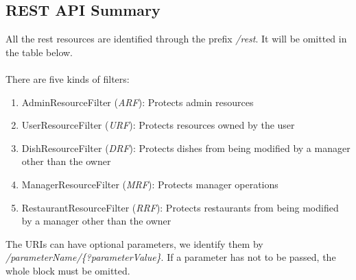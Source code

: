 \subsection{REST API Summary}

All the rest resources are identified through the prefix \textit{/rest}. It will be omitted in the table below.\\
\\
There are five kinds of filters:

\begin{enumerate}
	\item AdminResourceFilter (\textit{ARF}): Protects admin resources
	\item UserResourceFilter (\textit{URF}): Protects resources owned by the user
	\item DishResourceFilter (\textit{DRF}): Protects dishes from being modified by a manager other than the owner
	\item ManagerResourceFilter (\textit{MRF}): Protects manager operations
	\item RestaurantResourceFilter (\textit{RRF}): Protects restaurants from being modified by a manager other than the owner
\end{enumerate}
%
The URIs can have optional parameters, we identify them by \textit{/parameterName/\{?parameterValue\}}.
If a parameter has not to be passed, the whole block must be omitted.

